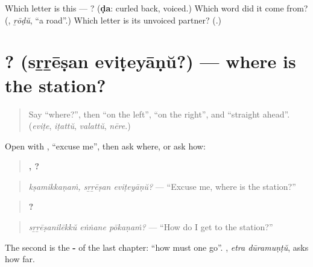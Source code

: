 \begin{tcolorbox}[breakable,colback=teal!4,colframe=teal!35!black,title={Before you move on}]
Which letter is this — ? (\textbf{ḍa}: curled back, voiced.) Which word did it come from? (\textbf{}, \emph{ṟōḍŭ}, \textquotedblleft{}a road\textquotedblright{}.) Which letter is its unvoiced partner? (\textbf{}.)
\end{tcolorbox}
\section[\texorpdfstring{\ml{സ്റ്റേഷൻ} \ml{എവിടെയാണ്}? (sṟṟēṣan eviṭeyāṇŭ?)}{സ്റ്റേഷൻ എവിടെയാണ്? (sṟṟēṣan eviṭeyāṇŭ?)}]{ ? (sṟṟēṣan eviṭeyāṇŭ?) — where is the station?}

\label{lesson:ML-C343-evideyanu}



\begin{quote}
Say \textquotedblleft{}where?\textquotedblright{}, then \textquotedblleft{}on the left\textquotedblright{}, \textquotedblleft{}on the right\textquotedblright{}, and \textquotedblleft{}straight ahead\textquotedblright{}. (\emph{eviṭe}, \emph{iṭattŭ}, \emph{valattŭ}, \emph{nēre}.)
\end{quote}

\begin{grammarlens}[title={Grammar Lens: asking}]
Open with \textbf{}, \textquotedblleft{}excuse me\textquotedblright{}, then ask where, or ask how:

\begin{quote}
\textbf{,  ?}
\end{quote}

\begin{quote}
\emph{kṣamikkaṇaṁ, sṟṟēṣan eviṭeyāṇŭ?} — \textquotedblleft{}Excuse me, where is the station?\textquotedblright{}
\end{quote}

\begin{quote}
\textbf{  ?}
\end{quote}

\begin{quote}
\emph{sṟṟēṣanilēkkŭ eṅṅane pōkaṇaṁ?} — \textquotedblleft{}How do I get to the station?\textquotedblright{}
\end{quote}

The second is the \textbf{-} of the last chapter: \textquotedblleft{}how must one go\textquotedblright{}. \textbf{ }, \emph{etra dūramuṇṭŭ}, asks how far.
\end{grammarlens}

